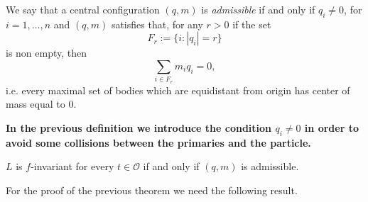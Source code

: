 \documentclass[smallcondensed]{svjour3}
\begin{document}
\begin{definition}
We say that a
central configuration $(q,m)$ is \emph{admissible} if and only if $q_i\neq 0$, for $i=1,\ldots,n$ and  $(q,m)$ satisfies that, for any $r>0$ if the set
\[F_r:=\{i:|q_i|=r\}\]
is non empty, then
\begin{equation}\label{eq:suma0}\sum_{i\in F_r}m_iq_i=0,\end{equation}
i.e. every maximal set of  bodies which are equidistant from origin has center of mass equal to $0$.
\end{definition}


\textbf{In the previous definition we introduce the condition $q_i\neq 0$  in order to avoid some collisions between the primaries and the particle.}

\begin{theorem}\label{thm:prim} $L$ is $f$-invariant for every $t\in\mathcal{O}$ if and only if $(q,m)$ is admissible.
\end{theorem}

For the proof of the previous theorem we need the following result.
\end{document}
